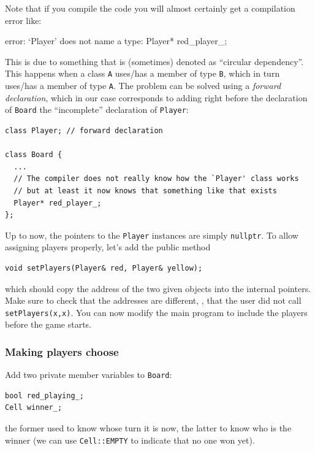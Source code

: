 \documentclass{article}
\begin{document}
Note that if you compile the code you will almost certainly get a compilation error like:
\begin{center}
  \ttfamily
  error: `Player' does not name a type: Player* red\string_player\string_;
\end{center}
This is due to something that is (sometimes) denoted as ``circular dependency''. This happens when a class \texttt{A} uses/has a member of type \texttt{B}, which in turn uses/has a member of type \texttt{A}. The problem can be solved using a \emph{forward declaration}, which in our case corresponds to adding right before the declaration of \texttt{Board} the ``incomplete'' declaration of \texttt{Player}:
\begin{lstlisting}[style=mycpp,numbers=none]
class Player; // forward declaration

class Board {
  ...
  // The compiler does not really know how the `Player' class works
  // but at least it now knows that something like that exists
  Player* red_player_;
};
\end{lstlisting}

Up to now, the pointers to the \texttt{Player} instances are simply \texttt{nullptr}. To allow assigning players properly, let's add the public method
\begin{lstlisting}[style=mycpp,numbers=none]
void setPlayers(Player& red, Player& yellow);
\end{lstlisting}
which should copy the address of the two given objects into the internal pointers. Make sure to check that the addresses are different, \ie, that the user did not call \texttt{setPlayers(x,x)}. You can now modify the main program to include the players before the game starts.


\subsubsection{Making players choose}

Add two private member variables to \texttt{Board}:
\begin{lstlisting}[style=mycpp,numbers=none]
bool red_playing_;
Cell winner_;
\end{lstlisting}
the former used to know whose turn it is now, the latter to know who is the winner (we can use \texttt{Cell::EMPTY} to indicate that no one won yet).
\end{document}
